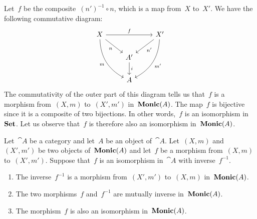 Let~$f$ be the composite~$(n')^{-1} ∘ n$, which is a map from~$X$ to~$X'$.
We have the following commutative diagram:
\[
	\begin{tikzcd}[column sep = normal]
		X
		\arrow{rr}[above]{f}
		\arrow{dr}[below left]{n}
		\arrow[bend right]{ddr}[below left]{m}
		&
		{}
		&
		X'
		\arrow{dl}[below right]{n'}
		\arrow[bend left]{ddl}[below right]{m'}
		\\
		{}
		&
		A'
		\arrow{d}[right]{i}
		&
		{}
		\\
		{}
		&
		A
		&
		{}
	\end{tikzcd}
\]
The commutativity of the outer part of this diagram tells us that~$f$ is a morphism from~$(X, m)$ to~$(X', m')$ in~$\mathbf{Monic}(A)$.
The map~$f$ is bijective since it is a composite of two bijections.
In other words,~$f$ is an isomorphism in~$\mathbf{Set}$.
Let us observe that~$f$ is therefore also an isomorphism in~$\mathbf{Monic}(A)$.

\begin{proposition}
	Let~$\cat{A}$ be a category and let~$A$ be an object of~$\cat{A}$.
	Let~$(X, m)$ and~$(X', m')$ be two objects of~$\mathbf{Monic}(A)$ and let~$f$ be a morphism from~$(X, m)$ to~$(X', m')$.
	Suppose that~$f$ is an isomorphism in~$\cat{A}$ with inverse~$f^{-1}$.
	\begin{enumerate}

		\item
			The inverse~$f^{-1}$ is a morphism from~$(X', m')$ to~$(X, m)$ in~$\mathbf{Monic}(A)$.

		\item
			\label{again mutually inverse in monic category}
			The two morphisms~$f$ and~$f^{-1}$ are mutually inverse in~$\mathbf{Monic}(A)$.

		\item
			The morphism~$f$ is also an isomorphism in~$\mathbf{Monic}(A)$.

	\end{enumerate}
\end{proposition}

